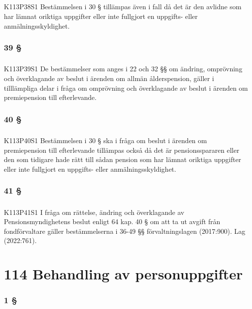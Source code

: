 \documentclass[a4paper,notitlepage,openany,10pt]{book}
\begin{document}
\paragraph*{}
{\tiny K113P38S1}
Bestämmelsen i 30 § tillämpas även i fall då det är den avlidne som har lämnat oriktiga uppgifter eller inte fullgjort en uppgifts- eller anmälningsskyldighet.
\subsection*{39 §}
\paragraph*{}
{\tiny K113P39S1}
De bestämmelser som anges i 22 och 32 §§ om ändring, omprövning och överklagande av beslut i ärenden om allmän ålderspension, gäller i tilllämpliga delar i fråga om omprövning och överklagande av beslut i ärenden om premiepension till efterlevande.
\subsection*{40 §}
\paragraph*{}
{\tiny K113P40S1}
Bestämmelsen i 30 § ska i fråga om beslut i ärenden om premiepension till efterlevande tillämpas också då det är pensionsspararen eller den som tidigare hade rätt till sådan pension som har lämnat oriktiga uppgifter eller inte fullgjort en uppgifts- eller anmälningsskyldighet.
\subsection*{41 §}
\paragraph*{}
{\tiny K113P41S1}
I fråga om rättelse, ändring och överklagande av Pensionsmyndighetens beslut enligt 64 kap. 40 § om att ta ut avgift från fondförvaltare gäller bestämmelserna i 36-49 §§ förvaltningslagen (2017:900).
Lag (2022:761).
\chapter*{114 Behandling av personuppgifter}
\subsection*{1 §}
\end{document}
